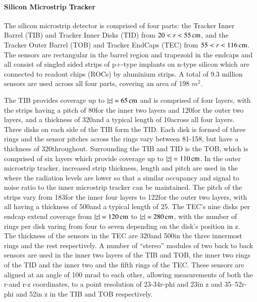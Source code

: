 \paragraph{Silicon Microstrip Tracker}
The silicon microstrip detector is comprised of four parts: the Tracker Inner Barrel (TIB) and Tracker Inner Disks (TID) from $20 < r < 55\,\text{cm}$, and the Tracker Outer Barrel (TOB) and Tracker EndCaps (TEC) from $55 < r < 116\,\text{cm}$.
The sensors are rectangular in the barrel region and trapezoid in the endcaps and all consist of singled sided strips of p+-type implants on n-type silicon which are connected to readout chips (ROCs) by aluminium strips.
A total of 9.3 million sensors are used across all four parts, covering an area of 198 $m^{2}$.

The TIB provides coverage up to $|z| = 65\,\text{cm}$ and is comprised of four layers, with the strips having a pitch of 80\mum for the inner two layers and 120\mum for the outer two layers, and a thickness of 320\mum and a typical length of 10\cm across all four layers.
Three disks on each side of the TIB form the TID. 
Each disk is formed of three rings and the sensor pitches across the rings vary between 81-158\mum, but have a thickness of 320\mum throughout.
Surrounding the TIB and TID is the TOB,	which is comprised of six layers which provide coverage up to $|z| = 110\,\text{cm}$.
In the outer microstrip tracker, increased strip thickness, length and pitch are used in the where the radiation levels are lower so that a similar occupancy and signal to noise ratio to the inner microstrip tracker can be maintained.
The pitch of the strips vary from 183\mum for the inner four layers to 122\mum for the outer two layers, with all having a thickness of 500\mum and a typical length of 25\cm. 
The TEC's nine disks per endcap extend coverage from $|z| = 120\,\text{cm}$ to $|z| = 280\,\text{cm}$, with the number of rings per disk varing from four to seven depending on the disk's position in z.
The thickness of the sensors in the TEC are 320\mum and 500\mum in the three innermost rings and the rest respectively.
A number of ``stereo'' modules of two back to back sensors are used in the inner two layers of the TIB and TOB, the inner two rings of the TID and the inner two and the fifth rings of the TEC.
These sensors are aligned at an angle of 100 mrad to each other, allowing measurements of both the r-\phi and r-z coordinates, to a point resolution of 23-34\mum r-phi and 23\mum in z and 35–52\mum r-phi and 52\mum in z in the TIB and TOB respectively.



